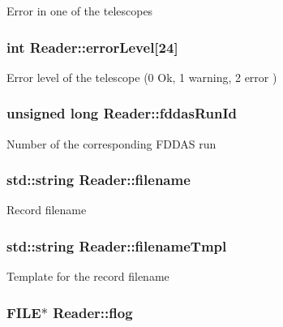 Error in one of the telescopes \hypertarget{classReader_a92b7378790ac975b65f159b6502cb47e}{
\subsubsection[{error\-Level}]{\setlength{\rightskip}{0pt plus 5cm}int Reader\-::error\-Level\mbox{[}24\mbox{]}\hspace{0.3cm}{\ttfamily [private]}}}\label{classReader_a92b7378790ac975b65f159b6502cb47e}
Error level of the telescope (0 Ok, 1 warning, 2 error ) \hypertarget{classReader_a59ce0afb9461ba7360d135e4b2c4fb95}{
\subsubsection[{fddas\-Run\-Id}]{\setlength{\rightskip}{0pt plus 5cm}unsigned long Reader\-::fddas\-Run\-Id\hspace{0.3cm}{\ttfamily [private]}}}\label{classReader_a59ce0afb9461ba7360d135e4b2c4fb95}
Number of the corresponding F\-D\-D\-A\-S run \hypertarget{classReader_a527aa131b2bafc4f6292828ac097a77f}{
\subsubsection[{filename}]{\setlength{\rightskip}{0pt plus 5cm}std\-::string Reader\-::filename\hspace{0.3cm}{\ttfamily [private]}}}\label{classReader_a527aa131b2bafc4f6292828ac097a77f}
Record filename \hypertarget{classReader_af4873d08f7454f94b69379682b86b761}{
\subsubsection[{filename\-Tmpl}]{\setlength{\rightskip}{0pt plus 5cm}std\-::string Reader\-::filename\-Tmpl\hspace{0.3cm}{\ttfamily [private]}}}\label{classReader_af4873d08f7454f94b69379682b86b761}
Template for the record filename \hypertarget{classReader_adced1caed365fc651778f352416914c6}{
\subsubsection[{flog}]{\setlength{\rightskip}{0pt plus 5cm}F\-I\-L\-E$\ast$ Reader\-::flog\hspace{0.3cm}{\ttfamily [private]}}}\label{classReader_adced1caed365fc651778f352416914c6}
